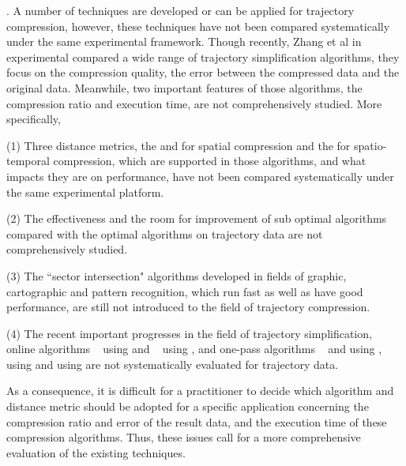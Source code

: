 . A number of techniques are developed or can be applied for trajectory compression, however, these techniques have not been compared systematically under the same experimental framework.
Though recently, Zhang et al in \cite{Zhang:Evaluation} experimental compared a wide range of trajectory simplification algorithms, they focus on the compression quality, \ie the error between the compressed data and the original data. Meanwhile, two important features of those algorithms, \ie the compression ratio and execution time, are not comprehensively studied. %
More specifically,

\ni (1) Three distance metrics, \ie the \ped and \dad for spatial compression and the \sed \cite{Meratnia:Spatiotemporal} for spatio-temporal compression, which are supported in those algorithms, and what impacts they are on performance, have not been compared systematically under the same experimental platform.

\ni (2) The effectiveness and the room for improvement of sub optimal \lsa algorithms compared with the optimal \lsa algorithms on trajectory data are not comprehensively studied.

\ni (3) The ``sector intersection" algorithms \cite{Williams:Longest, Sklansky:Cone, Dunham:Cone, Zhao:Sleeve} developed in fields of graphic, cartographic and pattern recognition, which run fast as well as have good performance, are still not introduced to the field of trajectory compression.

\ni (4) The recent important progresses in the field of trajectory simplification, \ie online algorithms \squishe~\cite{Muckell:Compression} using \sed and \bqsa~\cite{Liu:BQS} using \ped, and one-pass algorithms \operb~\cite{Lin:Operb} and \siped \cite{Williams:Longest, Sklansky:Cone, Dunham:Cone, Zhao:Sleeve} using \ped, \cised~\cite{Lin:Cised} using \sed and \interval \cite{Ke:Interval} using \dad are not systematically evaluated for trajectory data.


As a consequence, it is difficult for a practitioner to decide which algorithm and distance metric should be adopted for a specific application concerning the compression ratio and error of the result data, and the execution time of these compression algorithms.
%
Thus, these issues call for a more comprehensive evaluation of the existing \lsa techniques. %

